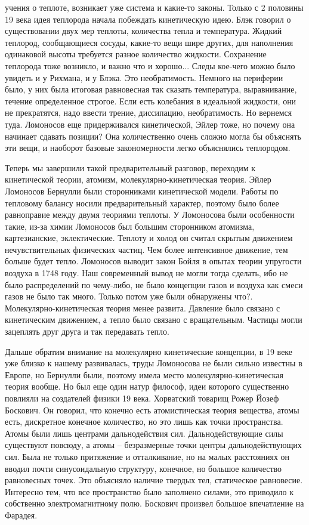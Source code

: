 \documentclass[a4paper, 12pt]{article}
\begin{document}
учения о теплоте, возникает уже система и какие-то законы. Только 
с 2 половины 19 века идея теплорода начала побеждать кинетическую идею. 
Блэк говорил о существовании двух мер теплоты, количества тепла 
и температура. Жидкий теплород, сообщающиеся сосуды, какие-то вещи шире 
других, для наполнения одинаковой высоты требуется разное количество 
жидкости. Сохранение теплорода тоже возникло, и важно что и хорошо... 
Следы кое-чего можно было увидеть и у Рихмана, и у Блэка. Это 
необратимость. Немного на периферии было, у них была итоговая 
равновесная так сказать температура, выравнивание, течение определенное 
строгое. Если есть колебания в идеальной жидкости, они не прекратятся, 
надо ввести трение, диссипацию, необратимость. Но вернемся туда. 
Ломоносов еще придерживался кинетической, Эйлер тоже, но почему она 
начинает сдавать позиции? Она количественно очень сложно могла бы 
объяснять эти вещи, и наоборот базовые закономерности легко объяснялись 
теплородом.

Теперь мы завершили такой предварительный разговор, переходим 
к кинетической теории, атомизм, молекулярно-кинетическая теория. Эйлер 
Ломоносов Бернулли были сторонниками кинетической модели. Работы по 
тепловому балансу носили предварительный характер, поэтому было более 
равноправие между двумя теориями теплоты. У Ломоносова были особенности 
такие, из-за химии Ломоносов был большим сторонником атомизма, 
картезианские, эклектические. Теплоту и холод он считал скрытым 
движением нечувствительных физических частиц. Чем более интенсивное 
движение, тем больше будет тепло. Ломоносов выводит закон Бойля в опытах 
теории упругости воздуха в 1748 году. Наш современный вывод не могли 
тогда сделать, ибо не было распределений по чему-либо, не было концепции 
газов и воздуха как смеси газов не было так много. Только потом уже были 
обнаружены что?. Молекулярно-кинетическая теория менее развита. Давление 
было связано с кинетическим движением, а тепло было связано 
с вращательным. Частицы могли зацеплять друг друга и так передавать 
тепло.

Дальше обратим внимание на молекулярно кинетические концепции, в 19 веке 
уже близко к нашему развивалась, труды Ломоносова не были сильно 
известны в Европе, но Бернулли были, поэтому имела место 
молекулярно-кинетическая теория вообще. Но был еще один натур философ, 
идеи которого существенно повлияли на создателей физики 19 века. 
Хорватский товарищ Рожер Йозеф Боскович. Он говорил, что конечно есть 
атомистическая теория вещества, атомы есть, дискретное конечное 
количество, но это лишь как точки пространства. Атомы были лишь центрами 
дальнодействия сил. Дальнодействующие силы существуют повсюду, а атомы 
-- безразмерные точки центры дальнодействующих сил. Была не только 
притяжение и отталкивание, но на малых расстояниях он вводил почти 
синусоидальную структуру, конечное, но большое количество равновесных 
точек. Это объясняло наличие твердых тел, статическое равновесие. 
Интересно тем, что все пространство было заполнено силами, это приводило 
к собственно электромагнитному полю. Боскович произвел большое 
впечатление на Фарадея.
\end{document}
